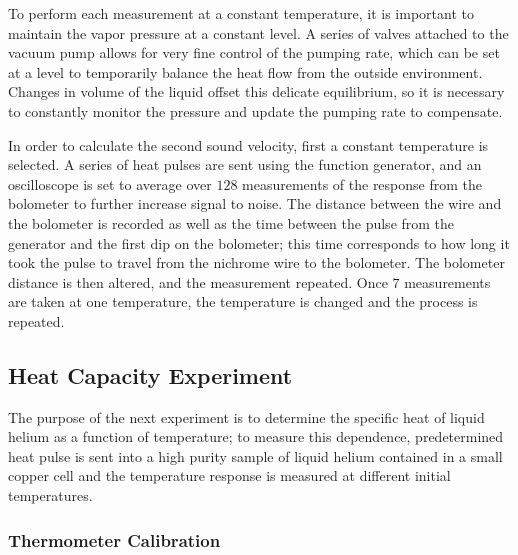 To perform each measurement at a constant temperature, it is important to maintain the vapor pressure at a constant level. A series of valves attached to the vacuum pump allows for very fine control of the pumping rate, which can be set at a level to temporarily balance the heat flow from the outside environment. Changes in volume of the liquid offset this delicate equilibrium, so it is necessary to constantly monitor the pressure and update the pumping rate to compensate.

In order to calculate the second sound velocity, first a constant temperature is selected. A series of heat pulses are sent using the function generator, and an oscilloscope is set to average over $128$ measurements of the response from the bolometer to further increase signal to noise. The distance between the wire and the bolometer is recorded as well as the time between the pulse from the generator and the first dip on the bolometer; this time corresponds to how long it took the pulse to travel from the nichrome wire to the bolometer. The bolometer distance is then altered, and the measurement repeated. Once $7$ measurements are taken at one temperature, the temperature is changed and the process is repeated.

\subsection{Heat Capacity Experiment}\label{heatcapacityexperiment}

The purpose of the next experiment is to determine the specific heat
of liquid helium as a function of temperature; to measure this
dependence, predetermined heat pulse is sent into a high purity sample
of liquid helium contained in a small copper cell and the temperature
response is measured at different initial temperatures.

\subsubsection{Thermometer Calibration}\label{thermometercalibration}

